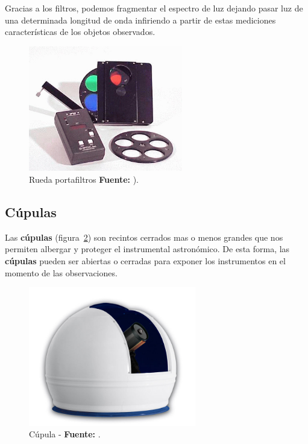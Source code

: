 \begin{itemize}
\begin{itemize}
Gracias a los filtros, podemos fragmentar el espectro de luz dejando pasar luz de una determinada longitud de onda infiriendo a partir de estas mediciones características de los objetos observados.


\begin{figure}[!ht]
	\begin{center}
		\includegraphics[width=0.6\textwidth]{../images/portafiltros.jpg}
		\caption[Rueda portafiltros]{Rueda portafiltros \textbf{Fuente:} \cite{rueda_portafiltros}).}
		\label{fig:portafiltros}
	\end{center}
\end{figure}


\subsection{Cúpulas}
Las \textbf{cúpulas} (figura~\ref{fig:cupula}) son recintos cerrados mas o menos grandes que nos permiten albergar y proteger el instrumental astronómico. De esta forma, las \textbf{cúpulas} pueden ser abiertas o cerradas para exponer los instrumentos en el momento de las observaciones.


\begin{figure}[!ht]
	\begin{center}
		\includegraphics[width=0.65\textwidth]{../images/cupula.jpg}
		\caption[Cúpula]{Cúpula - \textbf{Fuente:} \cite{cupula_ellunatico}.}
		\label{fig:cupula}
	\end{center}
\end{figure}



\end{itemize}
\end{itemize}
